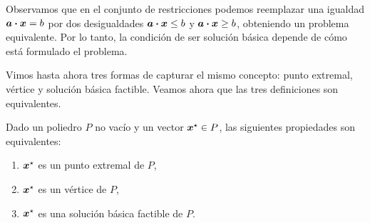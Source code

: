 Observamos que en el conjunto de restricciones podemos reemplazar una igualdad $\bm{a} \boldsymbol{\cdot} \bm{x} = b$ por dos desigualdades $\bm{a} \boldsymbol{\cdot} \bm{x} \le b$ y $\bm{a} \boldsymbol{\cdot} \bm{x} \ge b$, obteniendo un problema equivalente. Por lo tanto, la condición de ser solución básica depende de cómo está formulado el problema.

Vimos hasta ahora tres formas de capturar el mismo concepto: punto extremal, vértice y solución básica factible. Veamos ahora que las tres definiciones son equivalentes.

\begin{theorem}
Dado un poliedro $P$ no vacío y un vector $\bm{x}^\star \in P$, las siguientes propiedades son equivalentes:
\begin{enumerate}
\item $\bm{x}^\star$ es un punto extremal de $P$,
\item $\bm{x}^\star$ es un vértice de $P$,
\item $\bm{x}^\star$ es una solución básica factible de $P$.
\end{enumerate}
\end{theorem}

